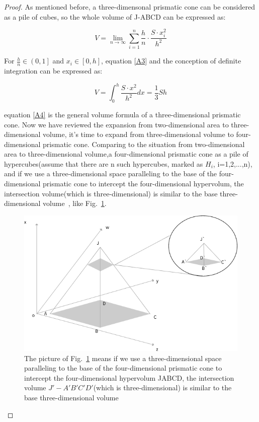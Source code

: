 \documentclass[runningheads]{llncs}
\begin{document}
\begin{proof}
As mentioned before, a three-dimensonal prismatic cone can be considered as a pile of cubes, so the whole volume of J-ABCD can be expressed as:

\begin{equation}\label{A3}
V=\lim \limits_{n \to \infty}\sum_{i=1}^{n}\frac{h}{n}\cdot \frac{S\cdot x_{i}^{2}}{h^{2}}
\end{equation}

For $\frac{h}{n}\in \left ( 0,1\right ]$ and $x_{i}\in \left [ 0,h\right ]$, equation \ref{A3} and the conception of definite integration can be expressed as:

\begin{equation}\label{A4}
V=\int_{0}^{h}\frac{S\cdot x^{2}}{h^{2}}dx = \frac{1}{3}Sh
\end{equation}

equation \ref{A4} is the general volume formula of a three-dimensional prismatic cone.
Now we have reviewed the expansion from two-dimensional area to three-dimensional volume, it's time to expand from three-dimensional volume to four-dimensional prismatic cone.
Comparing to the situation from two-dimensional area to three-dimensional volume,a four-dimensional prismatic cone as a pile of hypercubes(assume that there are n such hypercubes, marked as $H_{i}$, i=1,2,...,n), and if we use a three-dimensional space paralleling to the base of the four-dimensional prismatic cone to intercept the four-dimensional hypervolum, the intersection volume(which is three-dimensional) is similar to the base three-dimensional volume~\cite{ref_url1}, like Fig.~\ref{FigR1_2}.

\begin{figure}
\includegraphics[width=\textwidth]{../Fig/FigR1_2.png}
\caption{The picture of Fig.~\ref{FigR1_2} means if we use a three-dimensional space paralleling to the base of the four-dimensional prismatic cone to intercept the four-dimensional hypervolum JABCD, the intersection volume ${J}'-{A}'{B}'{C}'{D}'$(which is three-dimensional) is similar to the base three-dimensional volume} \label{FigR1_2}
\end{figure}


\end{proof}
\end{document}
